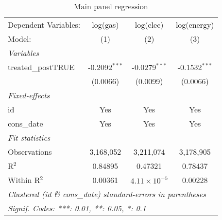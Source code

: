 
\begin{table}[htbp]
   \centering
   \caption{Main panel regression\label{tab:maintwfe}}
   \begin{tabular}{lccc}
      \tabularnewline\midrule\midrule
      Dependent Variables: & log(gas)        & log(elec)             & log(energy)\\
      Model:               & (1)             & (2)                   & (3)\\
      \midrule \emph{Variables} &   &   &  \\
      treated\_postTRUE   & -0.2092$^{***}$ & -0.0279$^{***}$       & -0.1532$^{***}$\\
                           & (0.0066)        & (0.0099)              & (0.0066)\\
      \midrule \emph{Fixed-effects} &   &   &  \\
      id                   & Yes             & Yes                   & Yes\\
      cons\_date          & Yes             & Yes                   & Yes\\
      \midrule \emph{Fit statistics} &   &   &  \\
      Observations         & 3,168,052       & 3,211,074             & 3,178,905\\
      R$^2$                & 0.84895         & 0.47321               & 0.78437\\
      Within R$^2$         & 0.00361         & $4.11\times 10^{-5}$ & 0.00228\\
      \midrule\midrule\multicolumn{4}{l}{\emph{Clustered (id \& cons\_date) standard-errors in parentheses}}\\
      \multicolumn{4}{l}{\emph{Signif. Codes: ***: 0.01, **: 0.05, *: 0.1}}\\
   \end{tabular}
\end{table}


